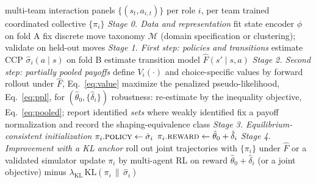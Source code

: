 \documentclass[11pt]{article}
\theoremstyle{definition}
\begin{document}
\begin{algorithm}[t]
\caption{Structural initialization then improvement for coordinated agents}
\label{alg:pipeline}
\begin{algorithmic}[1]
\Require multi-team interaction panels $\{(s_t,a_{i,t})\}$ per role $i$, per team
\Ensure trained coordinated collective $\{\pi_i\}$
\Statex \textit{Stage 0. Data and representation}
\State fit state encoder $\phi$ on fold A 
\State fix discrete move taxonomy $\mathcal{M}$ (domain specification or clustering); validate on held-out moves
\Statex \textit{Stage 1. First step: policies and transitions}
  \State estimate CCP $\hat\sigma_i(a\mid s)$ on fold B 
\EndFor
\State estimate transition model $\hat F(s'\mid s,a)$
\Statex \textit{Stage 2. Second step: partially pooled payoffs}
\State define $V_i(\cdot)$ and choice-specific values by forward rollout under $\hat F$, Eq.~\eqref{eq:value}
\State maximize the penalized pseudo-likelihood, Eq.~\eqref{eq:ppl}, for $(\hat\theta_0,\{\hat\delta_i\})$ 
\State robustness: re-estimate by the inequality objective, Eq.~\eqref{eq:pooled}; report identified \emph{sets} where weakly identified
\State fix a payoff normalization and record the shaping-equivalence class 
\Statex \textit{Stage 3. Equilibrium-consistent initialization}
  \State $\pi_i.\textsc{policy} \gets \hat\sigma_i$ 
  \State $\pi_i.\textsc{reward} \gets \hat\theta_0 + \hat\delta_i$ 
\EndFor
\Statex \textit{Stage 4. Improvement with a KL anchor}
\Repeat
  \State roll out joint trajectories with $\{\pi_i\}$ under $\hat F$ or a validated simulator
    \State update $\pi_i$ by multi-agent RL on reward $\hat\theta_0+\hat\delta_i$ (or a joint objective) minus $\lambda_{\mathrm{KL}}\,\mathrm{KL}(\pi_i \,\|\, \hat\sigma_i)$
  \EndFor
{}
\end{algorithmic}
\end{algorithm}
\end{document}
